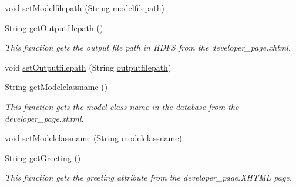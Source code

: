 \begin{DoxyCompactItemize}
void \hyperlink{classorg_1_1jboss_1_1as_1_1quickstarts_1_1greeter_1_1web_1_1_developer_controller_ac2c1dc7f49bd0b2190cac99c845eb6e6}{set\+Modelfilepath} (String \hyperlink{classorg_1_1jboss_1_1as_1_1quickstarts_1_1greeter_1_1web_1_1_developer_controller_a7217d97e73528f36dd074101cc6212f7}{modelfilepath})
\item 
String \hyperlink{classorg_1_1jboss_1_1as_1_1quickstarts_1_1greeter_1_1web_1_1_developer_controller_afb7be03bf898a7f7162be156b524d42c}{get\+Outputfilepath} ()
\begin{DoxyCompactList}\small\item\em This function gets the output file path in H\+D\+FS from the developer\+\_\+page.\+xhtml. \end{DoxyCompactList}\item 
void \hyperlink{classorg_1_1jboss_1_1as_1_1quickstarts_1_1greeter_1_1web_1_1_developer_controller_a0a24199c28f79ad9cfe3ad6a06493d13}{set\+Outputfilepath} (String \hyperlink{classorg_1_1jboss_1_1as_1_1quickstarts_1_1greeter_1_1web_1_1_developer_controller_a3e0376c736576915aa56e9a171393d35}{outputfilepath})
\item 
String \hyperlink{classorg_1_1jboss_1_1as_1_1quickstarts_1_1greeter_1_1web_1_1_developer_controller_afcb2b9de670a397308c66741e94ff156}{get\+Modelclassname} ()
\begin{DoxyCompactList}\small\item\em This function gets the model class name in the database from the developer\+\_\+page.\+xhtml. \end{DoxyCompactList}\item 
void \hyperlink{classorg_1_1jboss_1_1as_1_1quickstarts_1_1greeter_1_1web_1_1_developer_controller_a787145ce2fa2297e874b5e3eba63cb6d}{set\+Modelclassname} (String \hyperlink{classorg_1_1jboss_1_1as_1_1quickstarts_1_1greeter_1_1web_1_1_developer_controller_aec4dde64623318b1b021c6e3a88e496d}{modelclassname})
\item 
String \hyperlink{classorg_1_1jboss_1_1as_1_1quickstarts_1_1greeter_1_1web_1_1_developer_controller_a033fea1a1afc1e2ae958ce0466d62888}{get\+Greeting} ()
\begin{DoxyCompactList}\small\item\em This function gets the greeting attribute from the developer\+\_\+page.\+X\+H\+T\+ML page. \end{DoxyCompactList}\end{DoxyCompactItemize}
